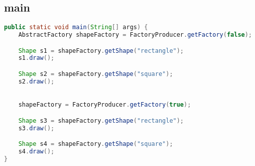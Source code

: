     \subsection{main}
\begin{lstlisting}[language=java]
    public static void main(String[] args) {
    AbstractFactory shapeFactory = FactoryProducer.getFactory(false);

    Shape s1 = shapeFactory.getShape("rectangle");
    s1.draw();

    Shape s2 = shapeFactory.getShape("square");
    s2.draw();

    
    shapeFactory = FactoryProducer.getFactory(true);

    Shape s3 = shapeFactory.getShape("rectangle");
    s3.draw();

    Shape s4 = shapeFactory.getShape("square");
    s4.draw();
}
\end{lstlisting}
